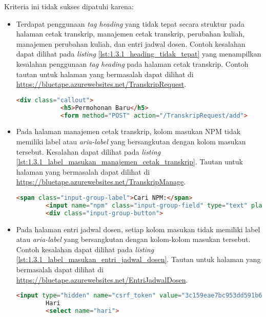 Kriteria ini tidak sukses dipatuhi karena:
\begin{itemize}
    \item Terdapat penggunaan \textit{tag heading} yang tidak tepat secara struktur pada halaman cetak transkrip, manajemen cetak transkrip, perubahan kuliah, manajemen perubahan kuliah, dan entri jadwal dosen. Contoh kesalahan dapat dilihat pada \textit{listing} \ref{lst:1.3.1_heading_tidak_tepat} yang menampilkan kesalahan penggunaan \textit{tag heading} pada halaman cetak transkrip. Contoh tautan untuk halaman yang bermasalah dapat dilihat di \url{https://bluetape.azurewebsites.net/TranskripRequest}.
    \begin{lstlisting}[frame=single, label={lst:1.3.1_heading_tidak_tepat}, language=HTML, caption=Kriteria Sukses 1.3.1 - Penggunaan \textit{Heading} Tidak Tepat]
        <div class="callout">
            <h5>Permohonan Baru</h5>
            <form method="POST" action="/TranskripRequest/add">
    \end{lstlisting}

    \item Pada halaman manajemen cetak transkrip, kolom masukan NPM tidak memiliki label atau \textit{aria-label} yang bersangkutan dengan kolom masukan tersebut. Kesalahan dapat dilihat pada \textit{listing} \ref{lst:1.3.1_label_masukan_manajemen_cetak_transkrip}. Tautan untuk halaman yang bermasalah dapat dilihat di \url{https://bluetape.azurewebsites.net/TranskripManage}.
    \begin{lstlisting}[frame=single, label={lst:1.3.1_label_masukan_manajemen_cetak_transkrip}, language=HTML, caption=Kriteria Sukses 1.3.1 - Tidak Terdapat Label pada Kolom Masukan di Halaman Manajemen Cetak Transkrip]
        <span class="input-group-label">Cari NPM:</span>
        <input name="npm" class="input-group-field" type="text" placeholder="2013730013" maxlength="10" minlength="10"/>
        <div class="input-group-button">
    \end{lstlisting}

    \item Pada halaman entri jadwal dosen, setiap kolom masukan tidak memiliki label atau \textit{aria-label} yang bersangkutan dengan kolom-kolom masukan tersebut. Contoh kesalahan dapat dilihat pada \textit{listing} \ref{lst:1.3.1_label_masukan_entri_jadwal_dosen}. Tautan untuk halaman yang bermasalah dapat dilihat di \url{https://bluetape.azurewebsites.net/EntriJadwalDosen}.
    \begin{lstlisting}[frame=single, label={lst:1.3.1_label_masukan_entri_jadwal_dosen}, language=HTML, caption=Kriteria Sukses 1.3.1 - Tidak Terdapat Label pada Kolom Masukan di Halaman Entri Jadwal Dosen]
        <input type="hidden" name="csrf_token" value="3c159eae7bc953dd591b679c080ed066"/>
        Hari
        <select name="hari">
    \end{lstlisting}
\end{itemize} 

